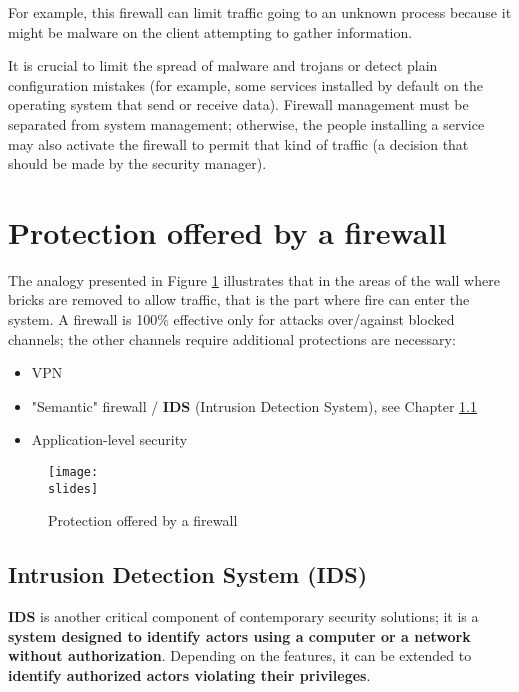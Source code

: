 For example, this firewall can limit traffic going to an unknown process because it might be malware on the client attempting to gather information.

It is crucial to limit the spread of malware and trojans or detect plain configuration mistakes (for example, some services installed by default on the operating system that send or receive data). Firewall management must be separated from system management; otherwise, the people installing a service may also activate the firewall to permit that kind of traffic (a decision that should be made by the security manager).



\section{Protection offered by a firewall}

The analogy presented in Figure \ref*{fig:firewall-protection-offered} illustrates that in the areas of the wall where bricks are removed to allow traffic, that is the part where fire can enter the system. A firewall is 100\% effective only for attacks over/against
blocked channels; the other channels require additional protections are necessary:

\begin{itemize}
    \item VPN
    \item "Semantic" firewall / \textbf{IDS} (Intrusion Detection System), see Chapter \ref{chap:IDS}
    \item Application-level security
\end{itemize}

\begin{figure}[h]
    \centering
    \texttt{[image: \\slides]}
    \caption{Protection offered by a firewall}
    \label{fig:firewall-protection-offered}
\end{figure}


\subsection{Intrusion Detection System (IDS)}\label{chap:IDS}

\textbf{IDS} is another critical component of contemporary security solutions; it is a \textbf{system designed to identify actors using a computer or a network without authorization}.
Depending on the features, it can be extended to \textbf{identify authorized actors violating their privileges}.

